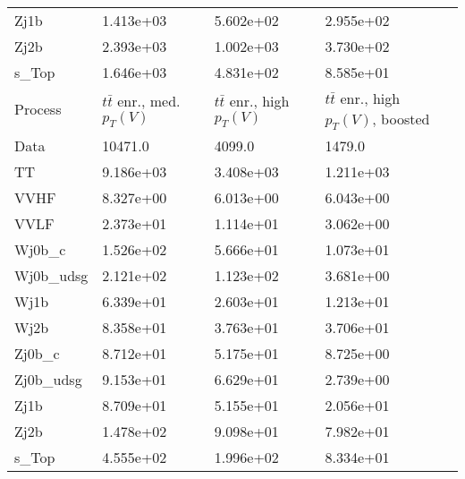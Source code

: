 \begin{table}
{\begin{tabularx}{0.8\textwidth}{|X|X|X|X|}
Zj1b & 1.413e+03 & 5.602e+02 & 2.955e+02 \\
Zj2b & 2.393e+03 & 1.002e+03 & 3.730e+02 \\
s\_Top & 1.646e+03 & 4.831e+02 & 8.585e+01 \\
\hline
\hline
Process & $t\bar{t}$ enr., med. $p_{T}(V)$ & $t\bar{t}$ enr., high $p_{T}(V)$ & $t\bar{t}$ enr., high $p_{T}(V)$, boosted \\
\hline
Data & 10471.0 & 4099.0 & 1479.0 \\
\hline
TT & 9.186e+03 & 3.408e+03 & 1.211e+03 \\
VVHF & 8.327e+00 & 6.013e+00 & 6.043e+00 \\
VVLF & 2.373e+01 & 1.114e+01 & 3.062e+00 \\
Wj0b\_c & 1.526e+02 & 5.666e+01 & 1.073e+01 \\
Wj0b\_udsg & 2.121e+02 & 1.123e+02 & 3.681e+00 \\
Wj1b & 6.339e+01 & 2.603e+01 & 1.213e+01 \\
Wj2b & 8.358e+01 & 3.763e+01 & 3.706e+01 \\
Zj0b\_c & 8.712e+01 & 5.175e+01 & 8.725e+00 \\
Zj0b\_udsg & 9.153e+01 & 6.629e+01 & 2.739e+00 \\
Zj1b & 8.709e+01 & 5.155e+01 & 2.056e+01 \\
Zj2b & 1.478e+02 & 9.098e+01 & 7.982e+01 \\
s\_Top & 4.555e+02 & 1.996e+02 & 8.334e+01 \\
\hline
\end{tabularx}
}
\label{tab:cr-Znn-2018}
\end{table}

